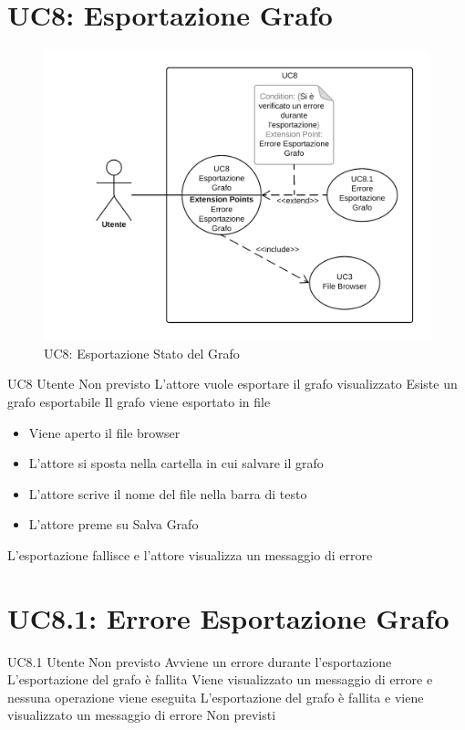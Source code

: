 \documentclass[../AnalisideiRequisiti.tex]{subfiles}
\begin{document}
\section{UC8: Esportazione Grafo}
\begin{figure}[H]
	\centering
	\includegraphics[width=\textwidth]{../img/UC8.png}
	\caption{UC8: Esportazione Stato del Grafo}
\end{figure}
\UserCase
{UC8}
{Utente}
{Non previsto}
{L'attore vuole esportare il grafo visualizzato}
{Esiste un grafo esportabile}
{Il grafo viene esportato in file}
{
	\begin{itemize}
			\item{} Viene aperto il file browser 
			\item{} L'attore si sposta nella cartella in cui salvare il grafo 
			\item{} L'attore scrive il nome del file nella barra di testo
			\item{} L'attore preme su Salva Grafo
	\end{itemize}
}
{L'esportazione fallisce e l'attore visualizza un messaggio di errore }

\section{UC8.1: Errore Esportazione Grafo}
\UserCase
{UC8.1}
{Utente}
{Non previsto}
{Avviene un errore durante l'esportazione}
{L'esportazione del grafo è fallita}
{Viene visualizzato un messaggio di errore e nessuna operazione viene eseguita}
{L'esportazione del grafo è fallita e viene visualizzato un messaggio di errore}
{Non previsti}
\end{document}
